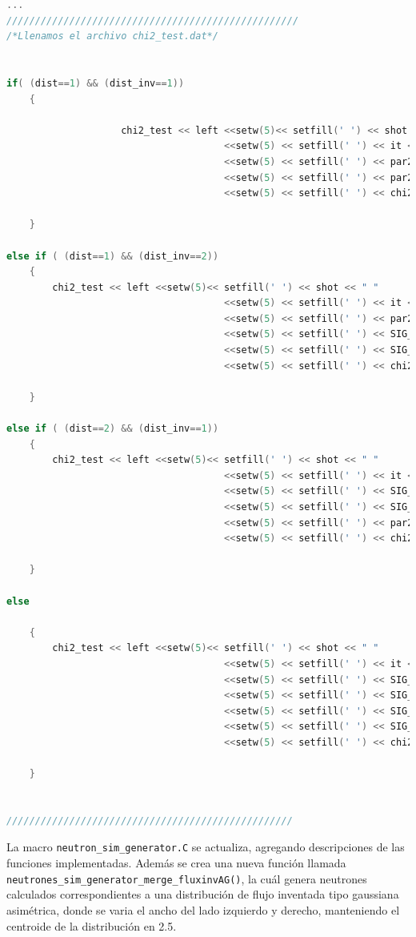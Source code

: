 \documentclass[11pt,letterpaper]{article}
\begin{document}
\begin{lstlisting}[language=c++]
...
///////////////////////////////////////////////////
/*Llenamos el archivo chi2_test.dat*/


if( (dist==1) && (dist_inv==1))
	{

					chi2_test << left <<setw(5)<< setfill(' ') << shot << " "
							          <<setw(5) << setfill(' ') << it << " "
							          <<setw(5) << setfill(' ') << par2  << " "  //ancho flujo semilla
							          <<setw(5) << setfill(' ') << par2_inv  << " "  //ancho flujo inventado
							          <<setw(5) << setfill(' ') << chi2_em2 << endl;

	}						          

else if ( (dist==1) && (dist_inv==2))
	{
		chi2_test << left <<setw(5)<< setfill(' ') << shot << " "
							          <<setw(5) << setfill(' ') << it << " "
							          <<setw(5) << setfill(' ') << par2  << " "
							          <<setw(5) << setfill(' ') << SIG_L_inv  << " "
							          <<setw(5) << setfill(' ') << SIG_R_inv  << " "
							          <<setw(5) << setfill(' ') << chi2_em2 << endl;

	}

else if ( (dist==2) && (dist_inv==1))
	{
		chi2_test << left <<setw(5)<< setfill(' ') << shot << " "
							          <<setw(5) << setfill(' ') << it << " "
							          <<setw(5) << setfill(' ') << SIG_L  << " "
							          <<setw(5) << setfill(' ') << SIG_R  << " "
							          <<setw(5) << setfill(' ') << par2_inv  << " "
							          <<setw(5) << setfill(' ') << chi2_em2 << endl;

	}

else

	{
		chi2_test << left <<setw(5)<< setfill(' ') << shot << " "
							          <<setw(5) << setfill(' ') << it << " "
							          <<setw(5) << setfill(' ') << SIG_L  << " "
							          <<setw(5) << setfill(' ') << SIG_R  << " "
							          <<setw(5) << setfill(' ') << SIG_L_inv  << " "
							          <<setw(5) << setfill(' ') << SIG_R_inv  << " "
							          <<setw(5) << setfill(' ') << chi2_em2 << endl;

	}


//////////////////////////////////////////////////
\end{lstlisting}

La macro \verb|neutron_sim_generator.C| se actualiza, agregando descripciones de las funciones implementadas. Además se crea una nueva función llamada \verb|neutrones_sim_generator_merge_fluxinvAG()|, la cuál genera neutrones calculados correspondientes a una distribución de flujo inventada tipo gaussiana asimétrica, donde se varia el ancho del lado izquierdo y derecho, manteniendo el centroide de la distribución en 2.5.
\end{document}
